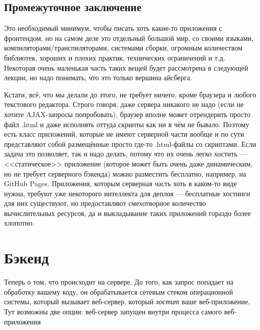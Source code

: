 \documentclass[a5paper]{article}
\begin{document}
\subsection{Промежуточное заключение}

Это необходимый минимум, чтобы писать хоть какие-то приложения с фронтендом, но на самом деле это отдельный большой мир, со своими языками, компиляторами/транспиляторами, системами сборки, огромным количеством библиотек, хороших и плохих практик, технических ограничений и т.д. Некоторая очень маленькая часть таких вещей будет рассмотрена в следующей лекции, но надо понимать, что это только вершина айсберга.

Кстати, всё, что мы делали до этого, не требует ничего, кроме браузера и любого текстового редактора. Строго говоря, даже сервера никакого не надо (если не хотите AJAX-запросы попробовать), браузер вполне может отрендерить просто файл .html и даже исполнять оттуда скрипты как ни в чём не бывало. Поэтому есть класс приложений, которые не имеют серверной части вообще и по сути представляют собой размещённые просто где-то .html-файлы со скриптами. Если задача это позволяет, так и надо делать, потому что их очень легко хостить --- <<статическое>> приложение (которое может быть очень даже динамическим, но не требует серверного бэкенда) можно разместить бесплатно, например, на GitHub Pages. Приложения, которым серверная часть хоть в каком-то виде нужна, требуют уже некоторого интеллекта для деплоя --- бесплатные хостинги для них существуют, но предоставляют смехотворное количество вычислительных ресурсов, да и выкладывание таких приложений гораздо более хлопотно.

\section{Бэкенд}

Теперь о том, что происходит на сервере. До того, как запрос попадает на обработку вашему коду, он обрабатывается сетевым стеком операционной системы, который вызывает веб-сервер, который \emph{хостит} ваше веб-приложение. Тут возможны две опции: веб-сервер запущен внутри процесса самого веб-приложения
\end{document}
